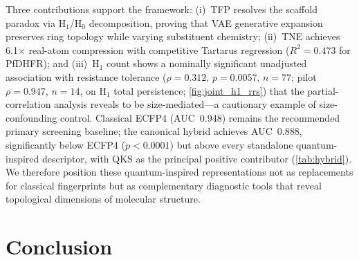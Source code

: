 \documentclass[11pt,a4paper]{article}
\begin{document}
Three contributions support the framework: (i)~TFP resolves the scaffold paradox via H$_1$/H$_0$ decomposition, proving that VAE generative expansion preserves ring topology while varying substituent chemistry; (ii)~TNE achieves \num{6.1}$\times$ real-atom compression with competitive Tartarus regression ($R^2 = 0.473$ for PfDHFR); and (iii)~H$_1$ count shows a nominally significant unadjusted association with resistance tolerance ($\rho = 0.312$, $p = 0.0057$, $n = 77$; pilot $\rho = 0.947$, $n = 14$, on H$_1$ total persistence; \cref{fig:joint_h1_rrs}) that the partial-correlation analysis reveals to be size-mediated---a cautionary example of size-confounding control. Classical ECFP4 (AUC~0.948) remains the recommended primary screening baseline; the canonical hybrid achieves AUC~\num{0.888}, significantly below ECFP4 ($p < 0.0001$) but above every standalone quantum-inspired descriptor, with QKS as the principal positive contributor (\cref{tab:hybrid}). We therefore position these quantum-inspired representations not as replacements for classical fingerprints but as complementary diagnostic tools that reveal topological dimensions of molecular structure.


\section{Conclusion}
\end{document}
